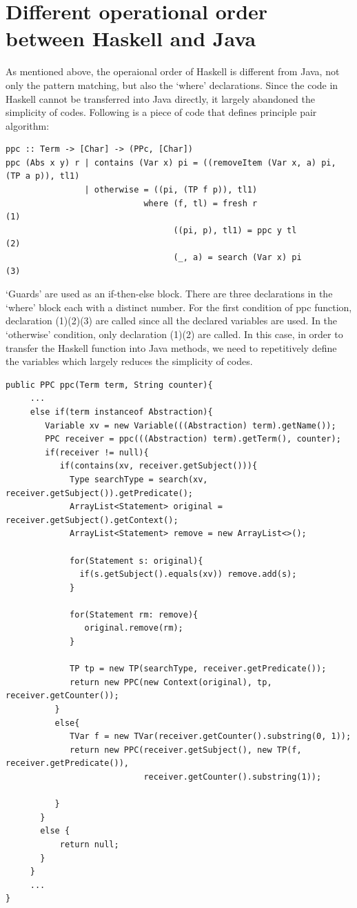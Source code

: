 \documentclass[a4paper,11pt,twoside]{report}
\begin{document}
\section{Different operational order between Haskell and Java}{\label{sec:hj}}
As mentioned above, the operaional order of Haskell is different from Java, not only the pattern matching, but also the `where' declarations. Since the code in Haskell cannot be transferred into Java directly, it largely abandoned the simplicity of codes. Following is a piece of code that defines principle pair algorithm:
\begin{verbatim}
ppc :: Term -> [Char] -> (PPc, [Char])
ppc (Abs x y) r | contains (Var x) pi = ((removeItem (Var x, a) pi, (TP a p)), tl1)
                | otherwise = ((pi, (TP f p)), tl1)
                            where (f, tl) = fresh r                    (1) 
                                  ((pi, p), tl1) = ppc y tl            (2)
                                  (_, a) = search (Var x) pi           (3)

\end{verbatim}

`Guards' are used as an if-then-else block. There are three declarations in the `where' block each with a distinct number. For the first condition of ppc function, declaration (1)(2)(3) are called since all the declared variables are used. In the `otherwise' condition, only declaration (1)(2) are called. In this case, in order to transfer the Haskell function into Java methods, we need to repetitively define the variables which largely reduces the simplicity of codes. 





\begin{verbatim}
public PPC ppc(Term term, String counter){
     ...
     else if(term instanceof Abstraction){
        Variable xv = new Variable(((Abstraction) term).getName());
        PPC receiver = ppc(((Abstraction) term).getTerm(), counter);
        if(receiver != null){
           if(contains(xv, receiver.getSubject())){
             Type searchType = search(xv, receiver.getSubject()).getPredicate();
             ArrayList<Statement> original = receiver.getSubject().getContext();
             ArrayList<Statement> remove = new ArrayList<>();

             for(Statement s: original){
               if(s.getSubject().equals(xv)) remove.add(s);
             }

             for(Statement rm: remove){
                original.remove(rm);
             }

             TP tp = new TP(searchType, receiver.getPredicate());
             return new PPC(new Context(original), tp, receiver.getCounter());
          }
          else{
             TVar f = new TVar(receiver.getCounter().substring(0, 1));
             return new PPC(receiver.getSubject(), new TP(f, receiver.getPredicate()),
                            receiver.getCounter().substring(1));

          }
       }
       else {
           return null;
       }
     }
     ...
}
\end{verbatim}
\end{document}
